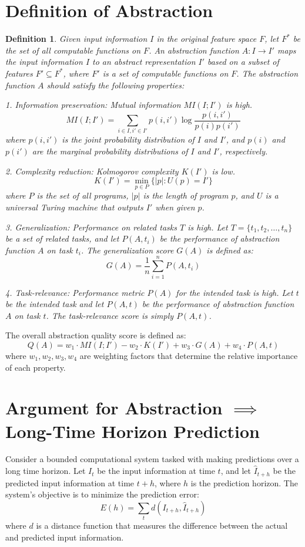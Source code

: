\documentclass[12pt]{article}
\newtheorem{definition}{Definition}
\begin{document}
\section{Definition of Abstraction}
\begin{definition}
Given input information $I$ in the original feature space $F$, let $F^*$ be the set of all computable functions on $F$. An abstraction function $A: I \to I'$ maps the input information $I$ to an abstract representation $I'$ based on a subset of features $F' \subseteq F^*$, where $F'$ is a set of computable functions on $F$. The abstraction function $A$ should satisfy the following properties:

1. Information preservation: Mutual information $MI(I; I')$ is high.
   $$MI(I; I') = \sum_{i \in I, i' \in I'} p(i, i') \log \frac{p(i, i')}{p(i)p(i')}$$
   where $p(i, i')$ is the joint probability distribution of $I$ and $I'$, and $p(i)$ and $p(i')$ are the marginal probability distributions of $I$ and $I'$, respectively.

2. Complexity reduction: Kolmogorov complexity $K(I')$ is low.
   $$K(I') = \min_{p \in P} \{|p|: U(p) = I'\}$$
   where $P$ is the set of all programs, $|p|$ is the length of program $p$, and $U$ is a universal Turing machine that outputs $I'$ when given $p$.

3. Generalization: Performance on related tasks $T$ is high.
   Let $T = \{t_1, t_2, \ldots, t_n\}$ be a set of related tasks, and let $P(A, t_i)$ be the performance of abstraction function $A$ on task $t_i$. The generalization score $G(A)$ is defined as:
   $$G(A) = \frac{1}{n} \sum_{i=1}^n P(A, t_i)$$

4. Task-relevance: Performance metric $P(A)$ for the intended task is high.
   Let $t$ be the intended task and let $P(A, t)$ be the performance of abstraction function $A$ on task $t$. The task-relevance score is simply $P(A, t)$.
\end{definition}

The overall abstraction quality score is defined as:
$$Q(A) = w_1 \cdot MI(I; I') - w_2 \cdot K(I') + w_3 \cdot G(A) + w_4 \cdot P(A, t)$$
where $w_1, w_2, w_3, w_4$ are weighting factors that determine the relative importance of each property.

\section{Argument for Abstraction $\implies$ Long-Time Horizon Prediction}
Consider a bounded computational system tasked with making predictions over a long time horizon. Let $I_t$ be the input information at time $t$, and let $\hat{I}_{t+h}$ be the predicted input information at time $t+h$, where $h$ is the prediction horizon. The system's objective is to minimize the prediction error:
$$E(h) = \sum_{t} d(I_{t+h}, \hat{I}_{t+h})$$
where $d$ is a distance function that measures the difference between the actual and predicted input information.
\end{document}
